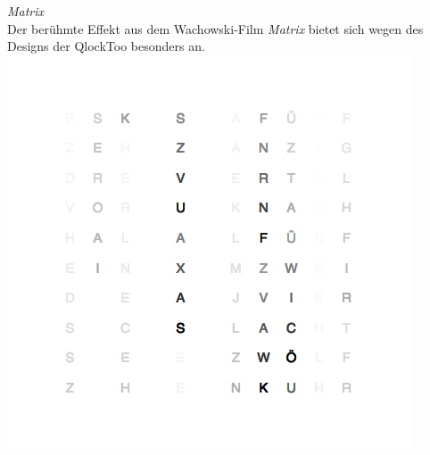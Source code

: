 \begin{multicols}{2}
\emph{Matrix} \\
Der berühmte Effekt aus dem Wachowski-Film \emph{Matrix} bietet sich wegen des Designs der QlockToo besonders an.
\includegraphics[width=\columnwidth]{Abbildungen/Software/Demo/Matrix}


\end{multicols}

